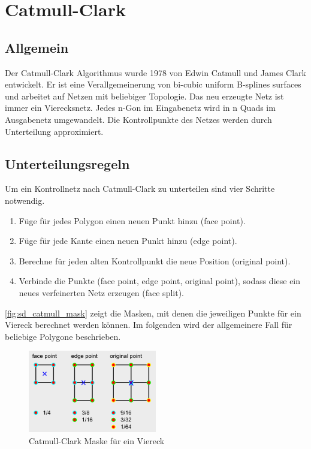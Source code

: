 \section{Catmull-Clark}

\subsection{Allgemein}

Der Catmull-Clark Algorithmus wurde 1978 von Edwin Catmull und James Clark entwickelt.
Er ist eine Verallgemeinerung von bi-cubic uniform B-splines surfaces und arbeitet auf
Netzen mit beliebiger Topologie.
Das neu erzeugte Netz ist immer ein Vierecksnetz. Jedes n-Gon im Eingabenetz wird in n Quads
im Ausgabenetz umgewandelt.
Die Kontrollpunkte des Netzes werden durch Unterteilung approximiert.


\subsection{Unterteilungsregeln}

Um ein Kontrollnetz nach Catmull-Clark zu unterteilen sind vier Schritte notwendig.
\begin{enumerate}
	\item Füge für jedes Polygon einen neuen Punkt hinzu (face point).
	\item Füge für jede Kante einen neuen Punkt hinzu (edge point).
	\item Berechne für jeden alten Kontrollpunkt die neue Position (original point).
	\item Verbinde die Punkte (face point, edge point, original point), sodass diese ein
	neues verfeinerten Netz erzeugen (face split).
\end{enumerate}

\autoref{fig:sd_catmull_mask} zeigt die Masken, mit denen die jeweiligen Punkte für ein Viereck berechnet werden können.
Im folgenden wird der allgemeinere Fall für beliebige Polygone beschrieben.
\begin{figure}
\centering
\includegraphics[width=0.5\textwidth]{content/media/sd_catmull_mask.png}
\caption{Catmull-Clark Maske für ein Viereck \cite{yoshihitoyagi.23.12.2015}}
\label{fig:sd_catmull_mask}
\end{figure}

